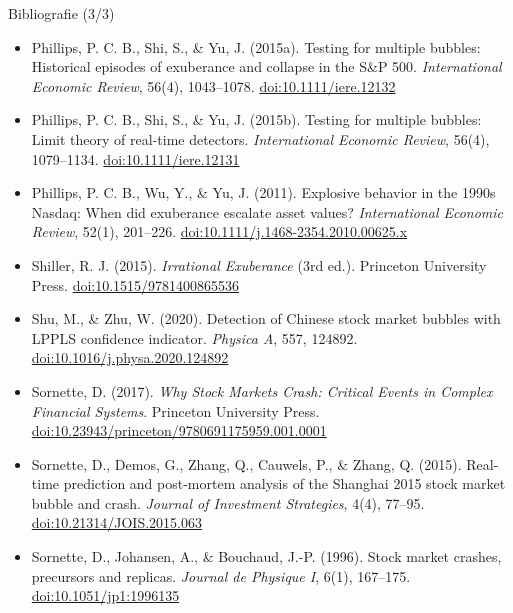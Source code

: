 \begin{frame}{Bibliografie (3/3)}
\itemsize{\scriptsize}
\begin{itemize}
    \item Phillips, P. C. B., Shi, S., \& Yu, J. (2015a). Testing for multiple bubbles: Historical episodes of exuberance and collapse in the S\&P 500. \textit{International Economic Review}, 56(4), 1043--1078. \href{https://doi.org/10.1111/iere.12132}{doi:10.1111/iere.12132}
    \item Phillips, P. C. B., Shi, S., \& Yu, J. (2015b). Testing for multiple bubbles: Limit theory of real-time detectors. \textit{International Economic Review}, 56(4), 1079--1134. \href{https://doi.org/10.1111/iere.12131}{doi:10.1111/iere.12131}
    \item Phillips, P. C. B., Wu, Y., \& Yu, J. (2011). Explosive behavior in the 1990s Nasdaq: When did exuberance escalate asset values? \textit{International Economic Review}, 52(1), 201--226. \href{https://doi.org/10.1111/j.1468-2354.2010.00625.x}{doi:10.1111/j.1468-2354.2010.00625.x}
    \item Shiller, R. J. (2015). \textit{Irrational Exuberance} (3rd ed.). Princeton University Press. \href{https://doi.org/10.1515/9781400865536}{doi:10.1515/9781400865536}
    \item Shu, M., \& Zhu, W. (2020). Detection of Chinese stock market bubbles with LPPLS confidence indicator. \textit{Physica A}, 557, 124892. \href{https://doi.org/10.1016/j.physa.2020.124892}{doi:10.1016/j.physa.2020.124892}
    \item Sornette, D. (2017). \textit{Why Stock Markets Crash: Critical Events in Complex Financial Systems}. Princeton University Press. \href{https://doi.org/10.23943/princeton/9780691175959.001.0001}{doi:10.23943/princeton/9780691175959.001.0001}
    \item Sornette, D., Demos, G., Zhang, Q., Cauwels, P., \& Zhang, Q. (2015). Real-time prediction and post-mortem analysis of the Shanghai 2015 stock market bubble and crash. \textit{Journal of Investment Strategies}, 4(4), 77--95. \href{https://doi.org/10.21314/JOIS.2015.063}{doi:10.21314/JOIS.2015.063}
    \item Sornette, D., Johansen, A., \& Bouchaud, J.-P. (1996). Stock market crashes, precursors and replicas. \textit{Journal de Physique I}, 6(1), 167--175. \href{https://doi.org/10.1051/jp1:1996135}{doi:10.1051/jp1:1996135}
\end{itemize}
\end{frame}


